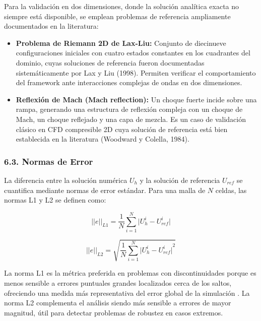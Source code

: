 \documentclass[11pt,openany]{book}
\begin{document}
Para la validación en dos dimensiones, donde la solución analítica exacta no siempre está disponible, se emplean problemas de referencia ampliamente documentados en la literatura:

\begin{itemize}
    \item \textbf{Problema de Riemann 2D de Lax-Liu: }Conjunto de diecinueve configuraciones iniciales con cuatro estados constantes en los cuadrantes del dominio, cuyas soluciones de referencia fueron documentadas sistemáticamente por Lax y Liu (1998). Permiten verificar el comportamiento del framework ante interacciones complejas de ondas en dos dimensiones.

    \item \textbf{Reflexión de Mach (Mach reflection): }Un choque fuerte incide sobre una rampa, generando una estructura de reflexión compleja con un choque de Mach, un choque reflejado y una capa de mezcla. Es un caso de validación clásico en CFD compresible 2D cuya solución de referencia está bien establecida en la literatura (Woodward y Colella, 1984).
    
\end{itemize}

\subsubsection{6.3. Normas de Error}\textbf{}

La diferencia entre la solución numérica $U_{h}$ y la solución de referencia $U_{ref}$ se cuantifica mediante normas de error estándar. Para una malla de $N$ celdas, las normas L1 y L2 se definen como:

\begin{equation}
    \lvert\lvert e \rvert\rvert_{L1} = \frac{1}{N}\sum_{i=1}^{N} \lvert U_{h}^{i} - U_{ref}^{i}\rvert
\end{equation}

\begin{equation}
    \lvert\lvert e \rvert\rvert_{L2} = \sqrt{\frac{1}{N}\sum_{i=1}^{N} {\lvert U_{h}^{i} - U_{ref}^{i}\rvert}^{2}}
\end{equation}

La norma L1 es la métrica preferida en problemas con discontinuidades porque es menos sensible a errores puntuales grandes localizados cerca de los saltos, ofreciendo una medida más representativa del error global de la simulación \parencite{toro2013riemann}. La norma L2 complementa el análisis siendo más sensible a errores de mayor magnitud, útil para detectar problemas de robustez en casos extremos.
\end{document}
